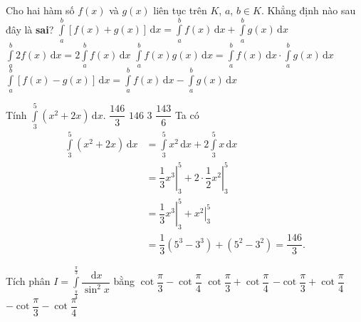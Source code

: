 \begin{ex}%
	Cho hai hàm số $f(x)$ và $g(x)$ liên tục trên $K$, $a$, $b\in K$. Khẳng định nào sau đây là \textbf{sai}?
	\choice
	{$\displaystyle\int\limits_a^b [f(x)+g(x)]\mathrm{\,d} x=\displaystyle\int\limits_a^b f(x)\mathrm{\,d} x+\displaystyle\int\limits_a^b g(x)\mathrm{\,d}x$}
	{$\displaystyle\int\limits_a^b 2f(x)\mathrm{\,d}x=2 \displaystyle\int\limits_a^b f(x)\mathrm{\,d}x$}
	{\True $\displaystyle\int\limits_a^b f(x)g(x)\mathrm{\,d} x=\displaystyle\int\limits_a^b f(x)\mathrm{\,d}x \cdot \displaystyle\int\limits_a^b g(x)\mathrm{\,d}x$}
	{$\displaystyle\int\limits_a^b[f(x)-g(x)]\mathrm{\,d} x=\displaystyle\int\limits_a^b f(x)\mathrm{\,d} x-\displaystyle\int\limits_a^b g(x)\mathrm{\,d}x$}
\end{ex}

\begin{ex}%
	Tính $\displaystyle\int\limits_{3}^{5}\left(x^{2}+2 x\right) \mathrm{\,d}x$.
	\choice
	{\True $\dfrac{146}{3}$}
	{$146$}
	{$3$}
	{$\dfrac{143}{6}$}
	\loigiai
	{
		Ta có
		\begin{align*}
			\int\limits_{3}^{5}\left(x^{2}+2 x\right) \mathrm{\,d}x & =\int\limits_{3}^{5} x^{2} \mathrm{\,d}x+2 \int\limits_{3}^{5} x \mathrm{\,d}x             \\
			                                                        & =\left.\dfrac{1}{3} x^{3}\right|_{3} ^{5}+\left.2 \cdot \dfrac{1}{2} x^{2}\right|_{3} ^{5} \\
			                                                        & =\left.\dfrac{1}{3} x^{3}\right|_{3} ^{5}+\left.x^{2}\right|_{3} ^{5}                      \\
			                                                        & =\dfrac{1}{3}\left(5^{3}-3^{3}\right)+\left(5^{2}-3^{2}\right)=\dfrac{146}{3}.
		\end{align*}
	}
\end{ex}

\begin{ex}%
	Tích phân $I=\displaystyle\int\limits_{\frac{\pi}{4}}^{\frac{\pi}{3}} \dfrac{\mathrm{\,d} x}{\sin ^2 x}$ bằng
	\choice
	{$\cot \dfrac{\pi}{3}-\cot \dfrac{\pi}{4}$}
	{$\cot \dfrac{\pi}{3}+\cot \dfrac{\pi}{4}$}
	{\True $-\cot \dfrac{\pi}{3}+\cot \dfrac{\pi}{4}$}
	{$-\cot \dfrac{\pi}{3}-\cot \dfrac{\pi}{4}$}
\end{ex}

